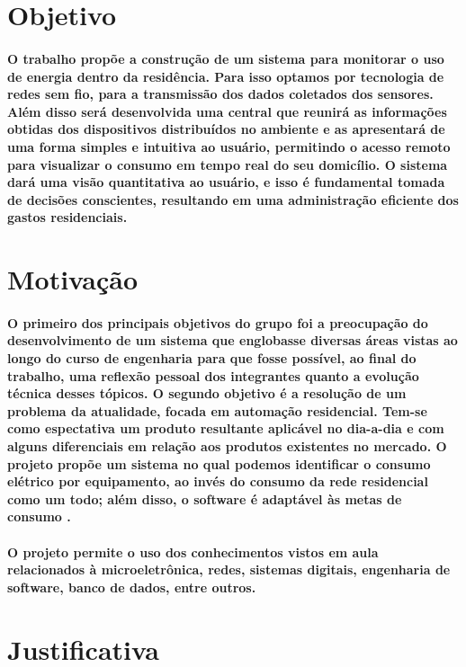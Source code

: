 \label{Cap:Introducao}

\section{Objetivo}
\label{Sec:objetivo}
\paragraph{
O trabalho propõe a construção de um sistema para monitorar o uso de energia dentro da residência. Para isso optamos por tecnologia de redes sem fio, para a transmissão dos dados coletados dos sensores. Além disso será desenvolvida uma central que reunirá as informações obtidas dos dispositivos distribuídos no ambiente e as apresentará de uma forma simples e intuitiva ao usuário, permitindo o acesso remoto para visualizar o consumo em tempo real do seu domicílio. O sistema dará uma visão quantitativa ao usuário, e isso é fundamental tomada de decisões conscientes, resultando em uma administração eficiente dos gastos residenciais.
}
\section{Motivação}
\label{Sec:motivacao}
\paragraph{
O primeiro dos principais objetivos do grupo foi a preocupação do desenvolvimento de um sistema que englobasse diversas áreas vistas ao longo do curso de engenharia para que fosse possível, ao final do trabalho, uma reflexão pessoal dos integrantes quanto a evolução técnica desses tópicos. O segundo objetivo é a resolução de um problema da atualidade, focada em automação residencial. Tem-se como espectativa um produto resultante aplicável no dia-a-dia e com alguns diferenciais em relação aos produtos existentes no mercado. O projeto propõe um sistema no qual podemos identificar o consumo elétrico por equipamento, ao invés do consumo da rede residencial como um todo; além disso, o software é adaptável às metas de consumo .}
\paragraph{O projeto permite o uso dos conhecimentos vistos em aula relacionados à microeletrônica, redes, sistemas digitais, engenharia de software, banco de dados, entre outros.
}
\section{Justificativa}
\label{Sec:justificativa}
